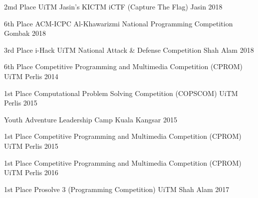 \begin{cvhonors}
  \cvhonor
    {2md Place}
    {UiTM Jasin's KICTM iCTF (Capture The Flag) }
    {Jasin}
    {2018}

  \cvhonor
    {6th Place}
    {ACM-ICPC Al-Khawarizmi National Programming Competition}
    {Gombak}
    {2018}

  \cvhonor
    {3rd Place}
    {i-Hack UiTM National Attack & Defense Competition}
    {Shah Alam}
    {2018}

\end{cvhonors}


\begin{cvhonors}

  \cvhonor
    {6th Place}
    {Competitive Programming and Multimedia Competition (CPROM)}
    {UiTM Perlis}
    {2014}

  \cvhonor
    {1st Place}
    {Computational Problem Solving Competition (COPSCOM)}
    {UiTM Perlis}
    {2015}

  \cvhonor
    {}
    {Youth Adventure Leadership Camp}
    {Kuala Kangsar}
    {2015}

  \cvhonor
    {1st Place}
    {Competitive Programming and Multimedia Competition (CPROM)}
    {UiTM Perlis}
    {2015}
        
  \cvhonor
    {1st Place}
    {Competitive Programming and Multimedia Competition (CPROM)}
    {UiTM Perlis}
    {2016}

  \cvhonor
    {1st Place}
    {Prosolve 3 (Programming Competition)}
    {UiTM Shah Alam}
    {2017}

\end{cvhonors}

